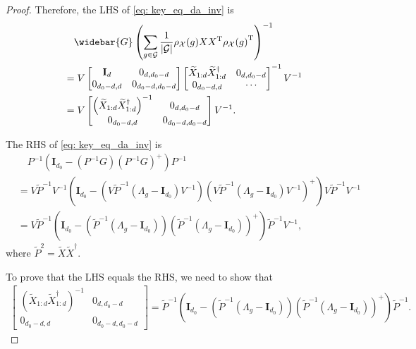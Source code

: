 \documentclass{article}
\newcommand{\T}{\mathrm{T}}
\newcommand{\G}{\mathcal{G}}
\theoremstyle{plain}
\theoremstyle{definition}
\theoremstyle{remark}
\theoremstyle{remark}
\begin{document}
\begin{proof}
    Therefore, the LHS of \autoref{eq: key_eq_da_inv} is
    \begin{align}
      &\quad \widebar{G} \left(\sum_{g \in \G} \frac{1}{|\G|} \rho_{\mathcal{X}}(g)XX^{\T} {\rho_{\mathcal{X}}(g)}^{\T}\right)^{-1} \\
      &= V \begin{bmatrix} \mathbf{I}_d & 0_{d, d_0-d} \\ 0_{d_0-d, d} & 0_{d_0-d, d_0-d} \end{bmatrix} \begin{bmatrix} \widetilde{X}_{1:d} \widetilde{X}_{1:d}^{\dagger} & 0_{d, d_0-d} \\ 0_{d_0-d, d} & \cdots \end{bmatrix}^{-1} V^{-1} \nonumber \\
      &= V \begin{bmatrix}\left(\widetilde{X}_{1:d} \widetilde{X}_{1:d}^{\dagger}\right)^{-1} & 0_{d, d_0-d} \\ 0_{d_0-d, d} & 0_{d_0-d, d_0-d} \end{bmatrix} V^{-1}.
    \end{align}

    The RHS of \autoref{eq: key_eq_da_inv} is
    \begin{align}
      &\quad P^{-1} \left(\mathbf{I}_{d_0} - (P^{-1} G) (P^{-1} G)^{+} \right) P^{-1} \nonumber \\
      &= V \widetilde{P}^{-1} V^{-1} \left(\mathbf{I}_{d_0} -  \left(V \widetilde{P}^{-1} (\Lambda_g-\mathbf{I}_{d_0}) V^{-1}\right) \left(V \widetilde{P}^{-1} (\Lambda_g-\mathbf{I}_{d_0}) V^{-1}\right)^{+} \right) V \widetilde{P}^{-1} V^{-1} \nonumber \\
      &= V \widetilde{P}^{-1} \left(\mathbf{I}_{d_0} -  \left(\widetilde{P}^{-1} (\Lambda_g-\mathbf{I}_{d_0})\right) \left(\widetilde{P}^{-1} (\Lambda_g-\mathbf{I}_{d_0}) \right)^{+} \right) \widetilde{P}^{-1} V^{-1},
    \end{align}
    where $\widetilde{P}^2 = \widetilde{X} \widetilde{X}^{\dagger}$.

    To prove that the LHS equals the RHS, we need to show that
    \begin{align}
      \begin{bmatrix}\left(\widetilde{X}_{1:d} \widetilde{X}_{1:d}^{\dagger}\right)^{-1} & 0_{d, d_0-d} \\ 0_{d_0-d, d} & 0_{d_0-d, d_0-d} \end{bmatrix} = \widetilde{P}^{-1} \left(\mathbf{I}_{d_0} -  \left(\widetilde{P}^{-1} (\Lambda_g-\mathbf{I}_{d_0})\right) \left(\widetilde{P}^{-1} (\Lambda_g-\mathbf{I}_{d_0}) \right)^{+} \right) \widetilde{P}^{-1}.
    \end{align}


\end{proof}
\end{document}
